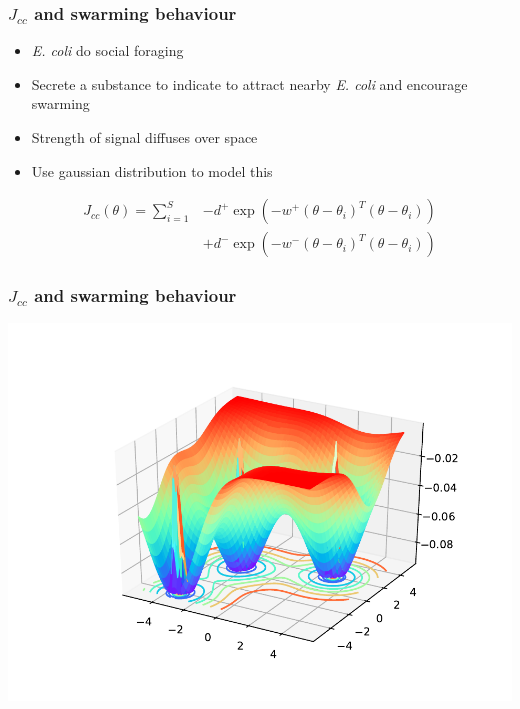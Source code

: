 \documentclass{beamer}
\begin{document}
\begin{frame}
\frametitle{$J_{cc}$ and swarming behaviour}
\begin{itemize}
  \item \textit{\textit{E. coli}} do social foraging
  \item Secrete a substance to indicate to attract nearby \textit{\textit{E. coli}} and encourage swarming
  \item Strength of signal diffuses over space
  \item Use gaussian distribution to model this
\end{itemize}
\begin{align*}
J_{cc}(\theta) = \sum_{i=1}^S &-d^+ \exp \left( -w^+ (\theta - \theta_i)^T (\theta - \theta_i) \right) \\ &+ d^- \exp \left( -w^- (\theta - \theta_i)^T (\theta - \theta_i) \right)
\end{align*}
\end{frame}

\begin{frame}
\frametitle{$J_{cc}$ and swarming behaviour}
\begin{center}
\includegraphics[scale=0.5]{assets/swarming}
\end{center}
\end{frame}

%
\end{document}
